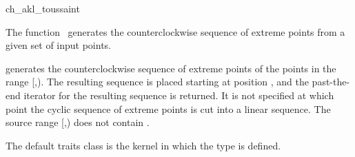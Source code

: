 
\begin{ccRefFunction}{ch_akl_toussaint}  %

\ccDefinition
  
The function \ccRefName\ generates the counterclockwise sequence of extreme
points from a given set of input points.



            {generates the counterclockwise sequence of extreme points
            of the points in the range [,).
            The resulting sequence is placed starting at position
            , and the past-the-end iterator for the resulting
            sequence is returned. It is not specified at which point the
            cyclic sequence of extreme points is cut into a linear sequence.
            \ccPrecond %
            The source range [,) does not contain
            .}


The default traits class  is the kernel in which the
type  is defined.


\end{ccRefFunction}
